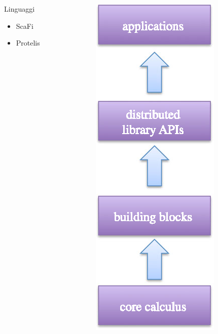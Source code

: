 \begin{frame}{\insertsectionhead}{\insertsubsectionhead}
\begin{columns}
\begin{column}{.7\textwidth}
\begin{block}{Linguaggi}
              \begin{itemize}[<+(1)->]
                \item ScaFi
                \item Protelis
              \end{itemize}
            \end{block}
          \end{column}
          \begin{column}{.25\textwidth}
            \begin{figure}
              \includegraphics[height=.7\textheight]{res/fig/stack-partial.eps}
            \end{figure}
          \end{column}
        \end{columns}
      \end{frame}

